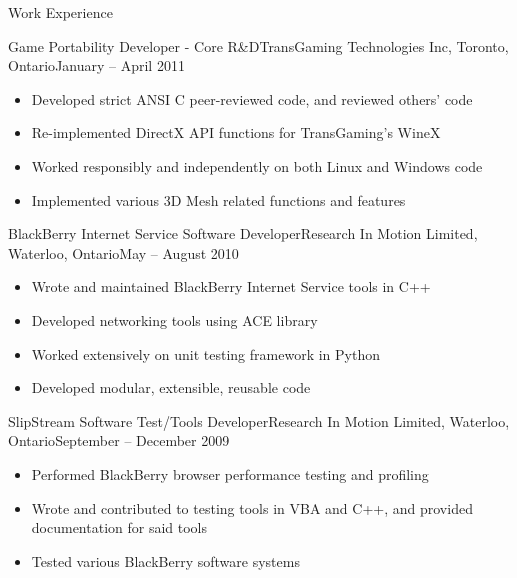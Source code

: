 \documentclass[11pt]{article}
\begin{document}
	\begin{section}{Work Experience} \\

        \begin{subsection}{Game Portability Developer - Core R\&D}{TransGaming Technologies Inc, Toronto, Ontario}{January -- April 2011}

            \begin{itemize}
                \item Developed strict ANSI C peer-reviewed code, and reviewed others' code
                \item Re-implemented DirectX API functions for TransGaming's WineX
                \item Worked responsibly and independently on both Linux and Windows code
                \item Implemented various 3D Mesh related functions and features
            \end{itemize}

        \end{subsection}

        \begin{subsection}{BlackBerry Internet Service Software Developer}{Research In Motion Limited, Waterloo, Ontario}{May -- August 2010}

            \begin{itemize}
                \item Wrote and maintained BlackBerry Internet Service tools in C++
                \item Developed networking tools using ACE library
                \item Worked extensively on unit testing framework in Python
                \item Developed modular, extensible, reusable code
            \end{itemize}

        \end{subsection}

		\begin{subsection}{SlipStream Software Test/Tools Developer}{Research In Motion Limited, Waterloo, Ontario}{September -- December 2009}

			\begin{itemize}
				\item Performed BlackBerry browser performance testing and profiling
				\item Wrote and contributed to testing tools in VBA and C++, and provided documentation for said tools
				\item Tested various BlackBerry software systems
			\end{itemize}


\end{subsection}
\end{section}
\end{document}
